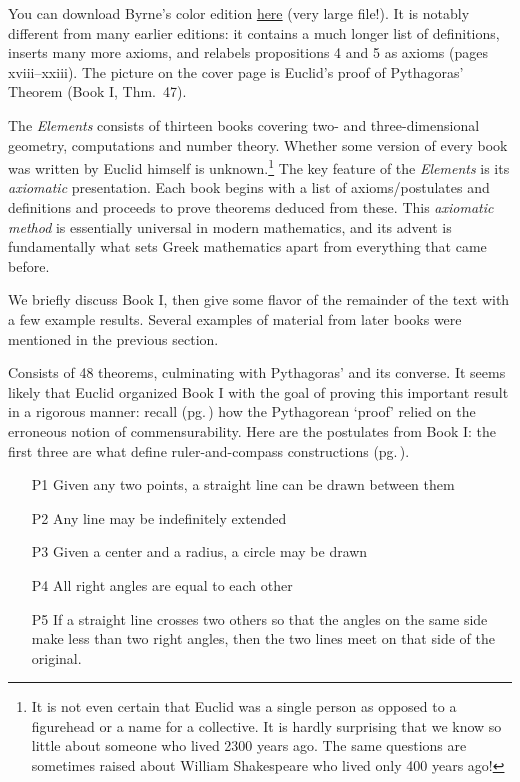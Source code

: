You can download Byrne's color edition \href{http://math.uci.edu/~ndonalds/Elements-I-VI.pdf}{here} (very large file!). It is notably different from many earlier editions: it contains a much longer list of definitions, inserts many more axioms, and relabels propositions 4 and 5 as axioms (pages xviii--xxiii). The picture on the cover page is Euclid's proof of Pythagoras' Theorem (Book I, Thm.\ 47).
\goodbreak



The \emph{Elements} consists of thirteen books covering two- and three-dimensional geometry, computations and number theory. Whether some version of every book was written by Euclid himself is unknown.\footnote{It is not even certain that Euclid was a single person as opposed to a figurehead or a name for a collective. It is hardly surprising that we know so little about someone who lived 2300 years ago. The same questions are sometimes raised about William Shakespeare who lived only 400 years ago!} The key feature of the \emph{Elements} is its \emph{axiomatic} presentation. Each book begins with a list of axioms/postulates and definitions and proceeds to prove theorems deduced from these. This \emph{axiomatic method} is essentially universal in modern mathematics, and its advent is fundamentally what sets Greek mathematics apart from everything that came before.\smallbreak

We briefly discuss Book I, then give some flavor of the remainder of the text with a few example results. Several examples of material from later books were mentioned in the previous section.



Consists of 48 theorems, culminating with Pythagoras' and its converse. It seems likely that Euclid organized Book I with the goal of proving this important result in a rigorous manner: recall (pg.\,\pageref{pthagorig}) how the Pythagorean `proof' relied on the erroneous notion of commensurability. Here are the postulates from Book I: the first three are what define ruler-and-compass constructions (pg.\,\pageref{pg:construction}).

\begin{itemize}\itemsep0pt
  \item[P1] Given any two points, a straight line can be drawn between them
  \item[P2] Any line may be indefinitely extended
  \item[P3] Given a center and a radius, a circle may be drawn
  \item[P4] All right angles are equal to each other
  \item[P5] If a straight line crosses two others so that the angles on the same side make less than two right angles, then the two lines meet on that side of the original.
\end{itemize}

